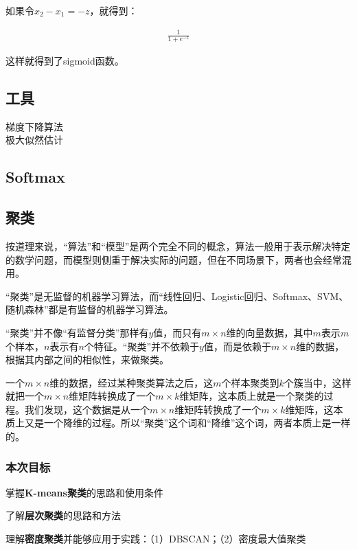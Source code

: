 \documentclass[UTF8]{ctexart}
\begin{document}
如果令$x_{2}-x_{1}=-z$，就得到：

\begin{equation}
\begin{aligned}
\frac{1}{1+e^{-z}}
\end{aligned}
\end{equation}

这样就得到了sigmoid函数。

\subsection{工具}
梯度下降算法\\
极大似然估计\\

\subsection{Softmax}

\subsection{聚类}

按道理来说，“算法”和“模型”是两个完全不同的概念，算法一般用于表示解决特定的数学问题，而模型则侧重于解决实际的问题，但在不同场景下，两者也会经常混用。

“聚类”是无监督的机器学习算法，而“线性回归、Logistic回归、Softmax、SVM、随机森林”都是有监督的机器学习算法。

“聚类”并不像“有监督分类”那样有$y$值，而只有$m \times n$维的向量数据，其中$m$表示$m$个样本，$n$表示有$n$个特征。“聚类”并不依赖于$y$值，而是依赖于$m \times n$维的数据，根据其内部之间的相似性，来做聚类。

一个$m \times n$维的数据，经过某种聚类算法之后，这$m$个样本聚类到$k$个簇当中，这样就把一个$m \times n$维矩阵转换成了一个$m \times k$维矩阵，这本质上就是一个聚类的过程。我们发现，这个数据是从一个$m \times n$维矩阵转换成了一个$m \times k$维矩阵，这本质上又是一个降维的过程。所以“聚类”这个词和“降维”这个词，两者本质上是一样的。

\subsubsection{本次目标}

掌握\textbf{K-means聚类}的思路和使用条件

了解\textbf{层次聚类}的思路和方法

理解\textbf{密度聚类}并能够应用于实践：（1）DBSCAN；（2）密度最大值聚类
\end{document}
